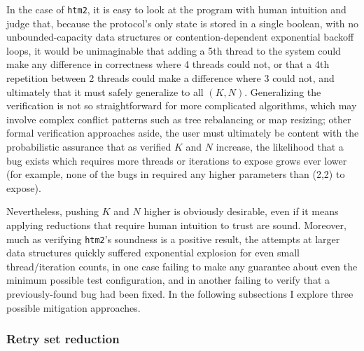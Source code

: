 In the case of {\tt htm2},
it is easy to look at the program with human intuition and judge that,
because the protocol's only state is stored in a single boolean,
with no unbounded-capacity data structures or
contention-dependent exponential backoff loops,
it would be unimaginable that adding a 5th thread to the system
could make any difference in correctness where 4 threads could not,
or that a 4th repetition between 2 threads could make a difference where 3 could not,
and ultimately that it must safely generalize to all $(K, N)$.
Generalizing the verification is not so straightforward
for more complicated algorithms,
which may involve complex conflict patterns such as tree rebalancing or map resizing;
other formal verification approaches aside,
the user must ultimately be content with the probabilistic assurance that
as verified $K$ and $N$ increase,
the likelihood that a bug exists which requires more threads or iterations to expose grows ever lower
(for example, none of the bugs in \sect{\ref{sec:tm-eval-bugs}} required any higher parameters than (2,2) to expose).

Nevertheless, pushing $K$ and $N$ higher is obviously desirable,
even if it means applying reductions that require human intuition to trust are sound.
Moreover, much as verifying {\tt htm2}'s soundness is a positive result,
the attempts at larger data structures quickly suffered exponential explosion
for even small thread/iteration counts,
in one case failing to make any guarantee about even the minimum possible test configuration,
and in another failing to verify that a previously-found bug had been fixed.
In the following subsections I explore three possible mitigation approaches.

\subsubsection{Retry set reduction}
\label{sec:tm-eval-retrysets}



